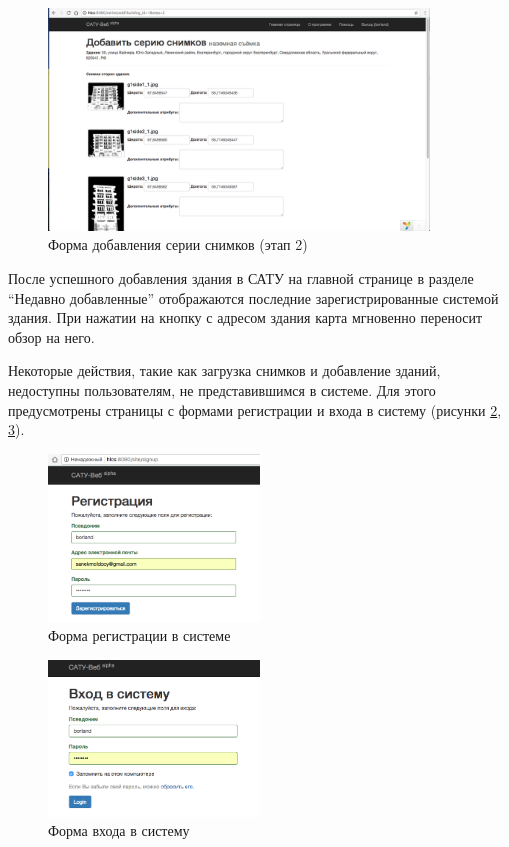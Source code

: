 	\begin{figure}[h!]
		\centering
		\includegraphics[width=0.9\textwidth]{images/scrshots/add-series_2}
		\caption{Форма добавления серии снимков (этап 2)}
		\label{scrshot:add-series_2}
	\end{figure}

	\pagebreak

	После успешного добавления здания в САТУ на главной странице в разделе “Недавно добавленные” отображаются последние зарегистрированные системой здания. При нажатии на кнопку с адресом здания карта мгновенно переносит обзор на него.
 
	Некоторые действия, такие как загрузка снимков и добавление зданий, недоступны пользователям, не представившимся в системе. Для этого предусмотрены страницы с формами регистрации и входа в систему (рисунки \ref{scrshot:register_1}, \ref{scrshot:login_1}).

	\begin{figure}[h!]
		\centering
		\includegraphics[width=0.5\textwidth]{images/scrshots/register_1}
		\caption{Форма регистрации в системе}
		\label{scrshot:register_1}
	\end{figure}

	\begin{figure}[h!]
		\centering
		\includegraphics[width=0.5\textwidth]{images/scrshots/login_1}
		\caption{Форма входа в систему}
		\label{scrshot:login_1}
	\end{figure}

